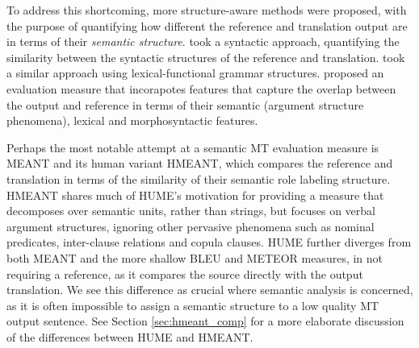 \documentclass[11pt]{article}
\newcommand{\secref}[1]{Section \ref{#1}}
\begin{document}

To address this shortcoming, more structure-aware methods were proposed, with the 
purpose of quantifying how different the reference and translation output are in terms 
of their {\it semantic structure}.  took a syntactic approach, 
quantifying the similarity between the syntactic structures of the reference and translation.
 took a similar approach using lexical-functional grammar structures.
 proposed an evaluation measure that incorapotes features
that capture the overlap between the output and reference in terms of their
semantic (argument structure phenomena), lexical and morphosyntactic features.

Perhaps the most notable attempt at a semantic MT evaluation measure is MEANT and
its human variant HMEANT, which compares the reference and translation in terms of the similarity
of their semantic role labeling structure. HMEANT shares much of HUME's motivation for providing a
measure that decomposes over semantic units, rather than strings, but focuses on verbal
argument structures, ignoring other pervasive phenomena such as nominal predicates, inter-clause
relations and copula clauses. HUME further diverges from both MEANT and the more shallow BLEU and
METEOR measures, in not requiring a reference, as it compares the source directly with the output
translation. We see this difference as crucial where semantic analysis is concerned, as it
is often impossible to assign a semantic structure to a low quality MT output sentence.
See \secref{sec:hmeant_comp} for a more elaborate discussion of the differences between HUME
and HMEANT.
\end{document}
